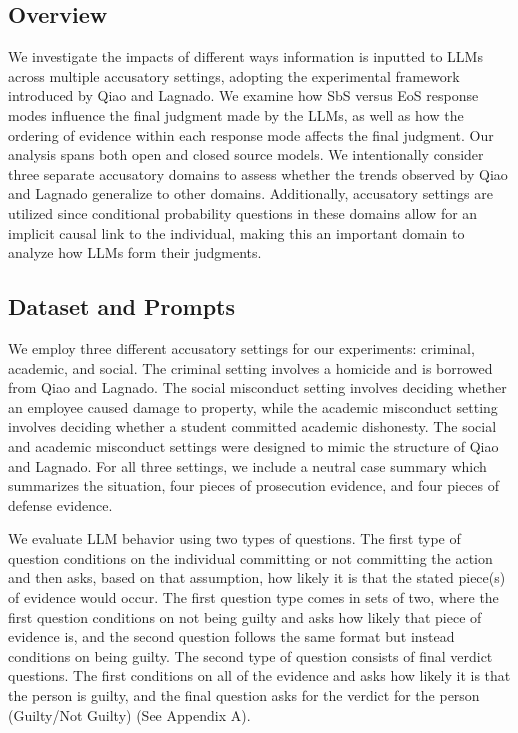 \documentclass[11pt, letterpaper]{article}
\begin{document}
\subsection{Overview}
We investigate the impacts of different ways information is inputted to LLMs across multiple accusatory settings, adopting the experimental framework introduced by Qiao and Lagnado. We examine how SbS versus EoS response modes influence the final judgment made by the LLMs, as well as how the ordering of evidence within each response mode affects the final judgment. Our analysis spans both open and closed source models. We intentionally consider three separate accusatory domains to assess whether the trends observed by Qiao and Lagnado generalize to other domains. Additionally, accusatory settings are utilized since conditional probability questions in these domains allow for an implicit causal link to the individual, making this an important domain to analyze how LLMs form their judgments.  

\subsection{Dataset and Prompts}
We employ three different accusatory settings for our experiments: criminal, academic, and social. The criminal setting involves a homicide and is borrowed from Qiao and Lagnado. The social misconduct setting involves deciding whether an employee caused damage to property, while the academic misconduct setting involves deciding whether a student committed academic dishonesty. The social and academic misconduct settings were designed to mimic the structure of Qiao and Lagnado. For all three settings, we include a neutral case summary which summarizes the situation, four pieces of prosecution evidence, and four pieces of defense evidence.

We evaluate LLM behavior using two types of questions. The first type of question conditions on the individual committing or not committing the action and then asks, based on that assumption, how likely it is that the stated piece(s) of evidence would occur. The first question type comes in sets of two, where the first question conditions on not being guilty and asks how likely that piece of evidence is, and the second question follows the same format but instead conditions on being guilty. The second type of question consists of final verdict questions. The first conditions on all of the evidence and asks how likely it is that the person is guilty, and the final question asks for the verdict for the person (Guilty/Not Guilty) (See Appendix A).
\end{document}
